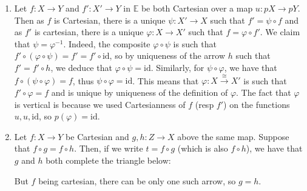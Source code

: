 \documentclass{report}
\newcommand{\bE}[0]{\mathbb E}
\newcommand{\bB}[0]{\mathbb B}
\newcommand{\idd}[0]{\mathrm{id}}
\begin{document}
\begin{answer}
    \begin{enumerate}[label=(\roman*)]
        \item Let $f : X \to Y$ and $f' : X' \to Y$ in $\bE$ be both Cartesian over a map $u : pX \to
        pY$. Then as $f$ is Cartesian, there is a unique $\psi : X' \to X$ such that $f' =\psi \circ 
        f$ and as $f'$ is cartesian, there is a unique $\varphi : X \to X'$ such that $f = \varphi
        \circ f'$. We claim that $\psi = \varphi ^{-1}$. Indeed, the composite $\varphi\circ \psi$
        is such that $f'\circ (\varphi\circ\psi) = f' = f'\circ \idd$, so by uniqueness of the arrow
        $h$ such that $f' = f'\circ h$, we deduce that $\varphi\circ\psi = \idd$. Similarly, for
        $\psi\circ\varphi$, we have that $f\circ(\psi\circ\varphi) = f$, thus $\psi\circ\varphi =
        \idd$. This means that $\varphi : X \overset{\cong}{\to} X'$ is such that $f'\circ \varphi = f$
        and is unique by uniqueness of the definition of $\varphi$. The fact that $\varphi$ is vertical
        is because we used Cartesianness of $f$ (resp $f'$) on the functions $u,u,\idd$, so
        $p(\varphi) = \idd$.
        \begin{center}
        \end{center}
        \item Let $f : X \to Y$ be Cartesian and $g,h : Z \to X$ above the same map. Suppose that
        $f\circ g = f\circ h$.
        Then, if we write $t = f\circ g$ (which is also $f\circ h$), we have that $g$ and $h$ both
        complete the triangle below:
        \begin{center}
        \end{center}
        But $f$ being cartesian, there can be only one such arrow, so $g = h$.
    \end{enumerate}
\end{answer}
\end{document}
